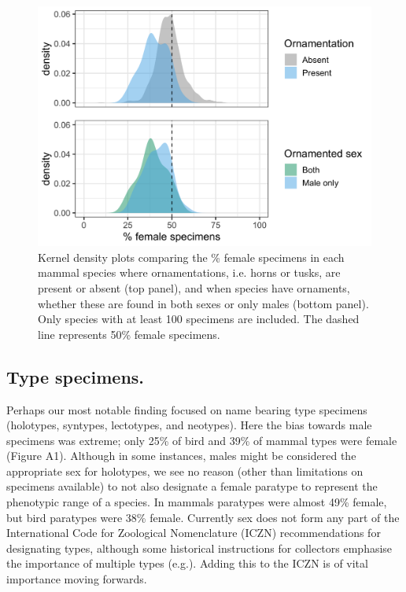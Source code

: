 \documentclass[a4paper, 12pt]{article}
\begin{document}
\begin{figure}
 \centering
  \includegraphics[width = \linewidth]{figures/ornamentation.png}
  \caption{Kernel density plots comparing the \% female specimens in each mammal species where ornamentations, i.e. horns or tusks, are present or absent (top panel), and when species have ornaments, whether these are found in both sexes or only males (bottom panel). 
  Only species with at least 100 specimens are included. 
  The dashed line represents 50\% female specimens. 
}
  \label{fig-horns}
\end{figure}

\subsection{Type specimens.} 
Perhaps our most notable finding focused on name bearing type specimens (holotypes, syntypes, lectotypes, and neotypes). 
Here the bias towards male specimens was extreme; only 25\% of bird and 39\% of mammal types were female (Figure A1). 
Although in some instances, males might be considered the appropriate sex for holotypes, we see no reason (other than limitations on specimens available) to not also designate a female paratype to represent the phenotypic range of a species. 
In mammals paratypes were almost 49\% female, but bird paratypes were 38\% female. 
Currently sex does not form any part of the International Code for Zoological Nomenclature (ICZN) recommendations for designating types, although some historical instructions for collectors emphasise the importance of multiple types (e.g.\cite{schuchert1897type}). 
Adding this to the ICZN is of vital importance moving forwards.
\end{document}
